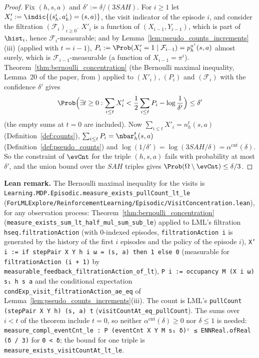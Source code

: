 \begin{proof}
\leanok
Fix $(h, s, a)$ and $\delta' := \delta/(3SAH)$. For $i \ge 1$ let $X'_i := \indic\{(s^i_h, a^i_h) = (s, a)\}$,
the visit indicator of the episode $i$, and consider the filtration $(\mathcal F_i)_{i \ge 0}$.
$X'_i$ is a function of $(X_{i-1}, Y_{i-1})$, which is part of $\hist_i$, hence $\mathcal F_i$-measurable;
and by Lemma~\ref{lem:pseudo_counts_increments}(iii) (applied with $t = i - 1$),
$P_i := \Prob(X'_i = 1 \mid \mathcal F_{i-1}) = p^{\pi^i}_h(s, a)$ almost surely, which is
$\mathcal F_{i-1}$-measurable (a function of $X_{i-1} = \pi^i$). Theorem~\ref{thm:bernoulli_concentration}
(the Bernoulli maximal inequality, Lemma~20 of the paper, from \cite{dann2017unifying}) applied
to $(X'_i)$, $(P_i)$ and $(\mathcal F_i)$ with the confidence $\delta'$ gives
\[
  \Prob\Big(\exists t \ge 0 : \sum_{i \le t} X'_i < \frac12 \sum_{i \le t} P_i - \log\frac1{\delta'}\Big) \le \delta'
\]
(the empty sums at $t = 0$ are included). Now $\sum_{i \le t} X'_i = n_h^t(s, a)$
(Definition~\ref{def:counts}), $\sum_{i \le t} P_i = \nbar_h^t(s, a)$ (Definition~\ref{def:pseudo_counts})
and $\log(1/\delta') = \log(3SAH/\delta) = \alpha^{\mathrm{cnt}}(\delta)$. So the constraint of $\evCnt$ for
the triple $(h, s, a)$ fails with probability at most $\delta'$, and the union bound over the $SAH$
triples gives $\Prob(\Omega \setminus \evCnt) \le \delta/3$.
\end{proof}

\textbf{Lean remark.} The Bernoulli maximal inequality for the visits is
\texttt{Learning.MDP.Episodic.measure\_exists\_pullCount\_lt\_le} (\texttt{ForLMLExplore/ReinforcementLearning/Episodic/VisitConcentration.lean}),
for any observation process: Theorem~\ref{thm:bernoulli_concentration}
(\texttt{measure\_exists\_sum\_lt\_half\_mul\_sum\_sub\_le}) applied to LML's filtration
\texttt{hseq.filtrationAction} (with $0$-indexed episodes, \texttt{filtrationAction i} is generated
by the history of the first $i$ episodes and the policy of the episode $i$),
\texttt{X' i := if stepPair X Y h i ω = (s, a) then 1 else 0} (measurable for
\texttt{filtrationAction (i + 1)} by \texttt{measurable\_feedback\_filtrationAction\_of\_lt}),
\texttt{P i := occupancy M (X i ω) s₁ h s a} and the conditional expectation
\texttt{condExp\_visit\_filtrationAction\_ae\_eq} of Lemma~\ref{lem:pseudo_counts_increments}(iii).
The count is LML's \texttt{pullCount (stepPair X Y h) (s, a) t} (\texttt{visitCountAt\_eq\_pullCount}).
The sums over $i < t$ of the theorem include $t = 0$, so neither $\alpha^{\mathrm{cnt}}(\delta) \ge 0$ nor
$\delta \le 1$ is needed: \texttt{measure\_compl\_eventCnt\_le : P (eventCnt X Y M s₁ δ)ᶜ ≤ ENNReal.ofReal (δ / 3)}
for \texttt{0 < δ}; the bound for one triple is \texttt{measure\_exists\_visitCountAt\_lt\_le}.

